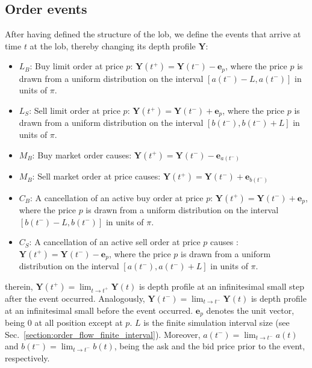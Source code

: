 \documentclass[11pt, a4paper]{thesis}  %
\begin{document}
%
%

\subsection{Order events}
\label{section:algo:order_events}

After having defined the structure of the \ac{lob}, we define the events that arrive at time $t$ at the \ac{lob}, thereby changing its depth profile $\mathbf{Y}$:
%
\begin{itemize}
	\item $L_B$: Buy limit order at price $p$: $\mathbf{Y}(t^+)=\mathbf{Y}(t^-)-\mathbf{e}_p$, 
	where the price $p$ is drawn from a uniform distribution on the interval $[a(t^-)-L,a(t^-)]$ 
	in units of $\pi$.
	
	\item $L_S$: Sell limit order at price $p$: $\mathbf{Y}(t^+)=\mathbf{Y}(t^-)+\mathbf{e}_p$, 
	where the price $p$ is drawn from a uniform distribution on the interval $[b(t^-),b(t^-)+L]$ 
	in units of $\pi$.
	\item $M_B$: Buy market order causes: $\mathbf{Y}(t^+)=\mathbf{Y}(t^-)-\mathbf{e}_{a(t^-)}$
	
	\item $M_B$: Sell market order at price causes: $\mathbf{Y}(t^+)=\mathbf{Y}(t^-)+\mathbf{e}_{b(t^-)}$
	
	\item $C_B$: A cancellation of an active buy order at price $p$: 
	$\mathbf{Y}(t^+)=\mathbf{Y}(t^-)+\mathbf{e}_p$,
	where the price $p$ is drawn from a uniform distribution on the interval $[b(t^-)-L,b(t^-)]$ 
	in units of $\pi$. 

	\item $C_S$:  A cancellation of an active sell order at price $p$ causes : 
	$\mathbf{Y}(t^+)=\mathbf{Y}(t^-)-\mathbf{e}_p$,
	where the price $p$ is drawn from a uniform distribution on the interval $[a(t^-),a(t^-)+L]$ 
	in units of $\pi$.  	
\end{itemize}
%
therein, $\mathbf{Y}(t^+)=\lim _{t\to t^+}\mathbf{Y}(t)$ is depth profile at an infinitesimal small step after the event occurred. Analogously, $\mathbf{Y}(t^-)=\lim _{t\to t^-}\mathbf{Y}(t)$ is depth profile at an infinitesimal small before the event occurred. $\mathbf{e}_p$ denotes the unit vector, being $0$ at all position except at $p$. $L$ is the finite simulation interval size (see Sec.~\ref{section:order_flow_finite_interval}). Moreover, $a(t^-)=\lim _{t\to t^-}a(t)$ and $b(t^-)=\lim _{t\to t^-}b(t)$, being the ask and the bid price prior to the event, respectively.
\end{document}
